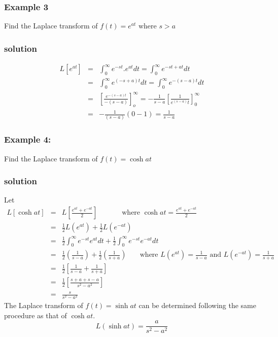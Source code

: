 \documentclass[12pt]{report}
\begin{document}
\subsubsection{Example 3}
Find the Laplace transform of $f(t)=e^{at} \mbox{ where } s> a$
\subsubsection{solution}
\begin{eqnarray}
L[e^{at}]&=& \int_0^\infty e^{-st}.e^{at}dt = \int_0^\infty e^{-st+at}dt\nonumber \\
&=& \int_0^\infty e^{(-s+a)t}dt = \int_0^\infty e^{-(s-a)t}dt\nonumber \\
&=& \left[\frac{e^{-(s-a)t}}{-(s-a)}\right]_o^\infty = -\frac{1}{s-a}\left[\frac{1}{e^{(s-a)}t} \right]_0^\infty \nonumber\\
&=& -\frac{1}{(s-a)}\left( 0-1 \right) = \frac{1}{s-a}
\end{eqnarray}
\newpage
\subsubsection{Example 4:}
Find the Laplace transform of $f(t)= \cosh at$
\subsubsection{solution}
Let
\begin{eqnarray}
L[\cosh at] &= & L \left[ \frac{e^{at}+e^{-at}}{2}\right]~~~~~~~~~~~~~~\mbox{ where } \cosh at= \frac{e^{at}+e^{-at}}{2}\nonumber \\
&=& \frac{1}{2}L(e^{at})+ \frac{1}{2}L(e^{-at})\nonumber \\
&=& \frac{1}{2} \int_0^\infty e^{-st}e^{at} dt + \frac{1}{2} \int_0^\infty e^{-st}e^{-at}dt \nonumber\\
&=& \frac{1}{2} \left( \frac{1}{s-a}\right) + \frac{1}{2} \left( \frac{1}{s+a}\right)~~~~~~~ \mbox{ where } L(e^{at})=\frac{1}{s-a} \mbox{ and } L(e^{-at})=\frac{1}{s+a} \nonumber\\
&=& \frac{1}{2} \left[ \frac{1}{s-a}+\frac{1}{s+a}\right] \nonumber\\
&=& \frac{1}{2} \left[ \frac{s+a+s-a}{s^2-a^2}\right] \nonumber\\
&=& \frac{s}{s^2-a^2}
\end{eqnarray}
The Laplace transform of $f(t)=\sinh at$ can be determined following the same procedure as that of $\cosh at$.
\begin{equation}
L(\sinh at)=\frac{a}{s^2-a^2}
\end{equation}
\end{document}
